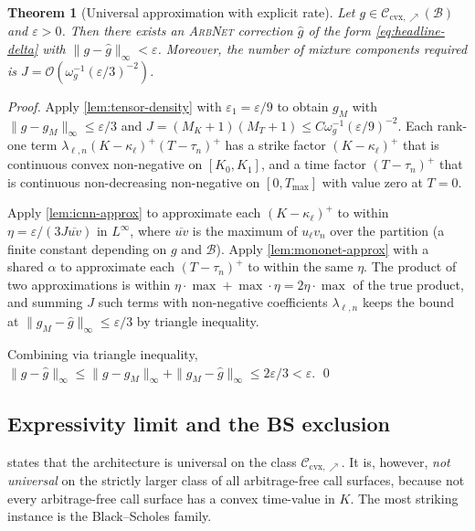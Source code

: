 \documentclass[largeformat]{interact}
\theoremstyle{plain}
\newtheorem{theorem}{Theorem}[section]
\theoremstyle{definition}
\newcommand{\eps}{\varepsilon}
\newcommand{\arbnet}{\textsc{ArbNet}}
\newcommand{\bs}{Black--Scholes}
\begin{document}
\begin{theorem}[Universal approximation with explicit rate]
\label{thm:universal-approximation}
Let $g \in \mathcal{C}_{\mathrm{cvx},\nearrow}(\mathcal{B})$ and $\eps > 0$. Then there exists an \arbnet{} correction $\widehat g$ of the form \cref{eq:headline-delta} with $\|g - \widehat g\|_\infty < \eps$. Moreover, the number of mixture components required is $J = \mathcal{O}(\omega_g^{-1}(\eps/3)^{-2})$.
\end{theorem}

\begin{proof}
Apply \cref{lem:tensor-density} with $\eps_1 = \eps/9$ to obtain $g_M$ with $\|g - g_M\|_\infty \leq \eps/3$ and $J = (M_K + 1)(M_T + 1) \leq C\omega_g^{-1}(\eps/9)^{-2}$. Each rank-one term $\lambda_{\ell,n}(K - \kappa_\ell)^+(T - \tau_n)^+$ has a strike factor $(K - \kappa_\ell)^+$ that is continuous convex non-negative on $[K_0, K_1]$, and a time factor $(T - \tau_n)^+$ that is continuous non-decreasing non-negative on $[0, T_{\max}]$ with value zero at $T = 0$.

Apply \cref{lem:icnn-approx} to approximate each $(K - \kappa_\ell)^+$ to within $\eta = \eps/(3J\overline{uv})$ in $L^\infty$, where $\overline{uv}$ is the maximum of $u_\ell v_n$ over the partition (a finite constant depending on $g$ and $\mathcal{B}$). Apply \cref{lem:mononet-approx} with a shared $\alpha$ to approximate each $(T - \tau_n)^+$ to within the same $\eta$. The product of two approximations is within $\eta \cdot \max + \max \cdot \eta = 2\eta \cdot \max$ of the true product, and summing $J$ such terms with non-negative coefficients $\lambda_{\ell,n}$ keeps the bound at $\|g_M - \widehat g\|_\infty \leq \eps/3$ by triangle inequality.

Combining via triangle inequality, $\|g - \widehat g\|_\infty \leq \|g - g_M\|_\infty + \|g_M - \widehat g\|_\infty \leq 2\eps/3 < \eps$.
\qed
\end{proof}

\subsection{Expressivity limit and the BS exclusion}
\label{sec:expressivity-limit}

 states that the architecture is universal on the class $\mathcal{C}_{\mathrm{cvx},\nearrow}$. It is, however, \emph{not universal} on the strictly larger class of all arbitrage-free call surfaces, because not every arbitrage-free call surface has a convex time-value in $K$. The most striking instance is the \bs{} family.
\end{document}
